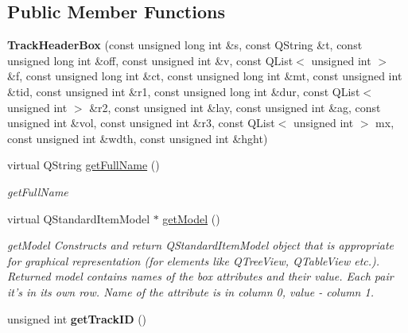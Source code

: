 \subsection*{Public Member Functions}
\begin{DoxyCompactItemize}
\item 
\hypertarget{class_track_header_box_ae0f610e7d4f74df90223733ade597133}{{\bfseries Track\-Header\-Box} (const unsigned long int \&s, const Q\-String \&t, const unsigned long int \&off, const unsigned int \&v, const Q\-List$<$ unsigned int $>$ \&f, const unsigned long int \&ct, const unsigned long int \&mt, const unsigned int \&tid, const unsigned int \&r1, const unsigned long int \&dur, const Q\-List$<$ unsigned int $>$ \&r2, const unsigned int \&lay, const unsigned int \&ag, const unsigned int \&vol, const unsigned int \&r3, const Q\-List$<$ unsigned int $>$ mx, const unsigned int \&wdth, const unsigned int \&hght)}\label{class_track_header_box_ae0f610e7d4f74df90223733ade597133}

\item 
virtual Q\-String \hyperlink{class_track_header_box_a7bc710a767026e2128ae46a1d3302778}{get\-Full\-Name} ()
\begin{DoxyCompactList}\small\item\em get\-Full\-Name \end{DoxyCompactList}\item 
virtual Q\-Standard\-Item\-Model $\ast$ \hyperlink{class_track_header_box_a59393dc4fe8791f266666f8f64efc510}{get\-Model} ()
\begin{DoxyCompactList}\small\item\em get\-Model Constructs and return Q\-Standard\-Item\-Model object that is appropriate for graphical representation (for elements like Q\-Tree\-View, Q\-Table\-View etc.). Returned model contains names of the box attributes and their value. Each pair it's in its own row. Name of the attribute is in column 0, value -\/ column 1. \end{DoxyCompactList}\item 
\hypertarget{class_track_header_box_a4a02fb3c9293a488aea1764c2fbd63ea}{unsigned int {\bfseries get\-Track\-I\-D} ()}\label{class_track_header_box_a4a02fb3c9293a488aea1764c2fbd63ea}

\end{DoxyCompactItemize}
